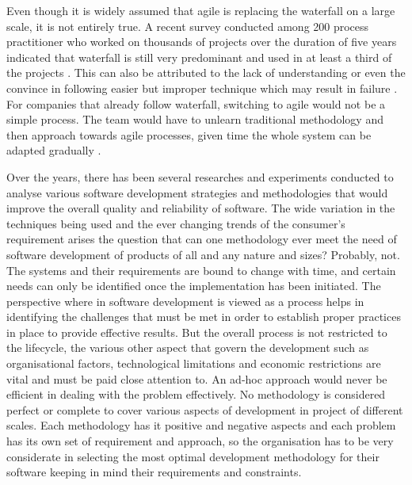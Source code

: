 \documentclass[12pt]{article}
\begin{document}
Even though it is widely assumed that agile is replacing the waterfall on a large scale, it is not entirely true. A recent survey conducted among 200 process practitioner who worked on thousands of projects over the duration of five years indicated that waterfall is still very predominant and used in at least a third of the projects \cite{laplante2004demise}. This can also be attributed to the lack of understanding or even the convince in following easier but improper technique which may result in failure \cite{laplante2004demise}. For companies that already follow waterfall, switching to agile would not be a simple process. The team would have to unlearn traditional methodology and then approach towards agile processes, given time the whole system can be adapted gradually \cite{sureshchandra2008moving}.


Over the years, there has been several researches and experiments conducted to analyse various software development strategies and methodologies that would improve the overall quality and reliability of software. The wide variation in the techniques being used and the ever changing trends of the consumer's requirement arises the question that can one methodology ever meet the need of software development of products of all and any nature and sizes? Probably, not. The systems and their requirements are bound to change with time, and certain needs can only be identified once the implementation has been initiated. The perspective where in software development is viewed as a process helps in identifying the challenges that must be met in order to establish proper practices in place to provide effective results. But the overall process is not restricted to the lifecycle, the various other aspect that govern the development such as organisational factors, technological limitations and economic restrictions are vital and must be paid close attention to. An ad-hoc approach would never be efficient in dealing with the problem effectively. No methodology is considered perfect or complete to cover various aspects of development in project of different scales. Each methodology has it positive and negative aspects and each problem has its own set of requirement and approach, so the organisation has to be very considerate in selecting the most optimal development methodology for their software keeping in mind their requirements and constraints.



\end{document}
